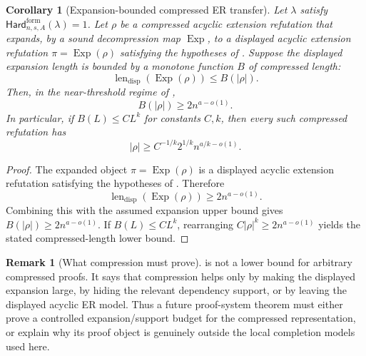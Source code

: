 \documentclass[11pt]{article}
\newtheorem{corollary}[theorem]{Corollary}
\theoremstyle{definition}
\newtheorem{remark}[theorem]{Remark}
\newcommand{\HardF}{\mathsf{Hard}^{\mathrm{form}}}
\begin{document}
\begin{corollary}[Expansion-bounded compressed ER transfer]\label{cor:compressed-er-expansion}
Let \(\lambda\) satisfy \(\HardF_{n,s,A}(\lambda)=1\).  Let \(\rho\) be a compressed acyclic extension refutation that expands, by a sound decompression map \(\operatorname{Exp}\), to a displayed acyclic extension refutation \(\pi=\operatorname{Exp}(\rho)\) satisfying the hypotheses of .  Suppose the displayed expansion length is bounded by a monotone function \(B\) of compressed length:
\[
  \operatorname{len}_{\mathrm{disp}}(\operatorname{Exp}(\rho))
  \le B(|\rho|).
\]
Then, in the near-threshold regime of ,
\[
  B(|\rho|)\ge 2n^{a-o(1)}.
\]
In particular, if \(B(L)\le C L^k\) for constants \(C,k\), then every such compressed refutation has
\[
  |\rho|\ge C^{-1/k}2^{1/k}n^{a/k-o(1)}.
\]
\end{corollary}

\begin{proof}
The expanded object \(\pi=\operatorname{Exp}(\rho)\) is a displayed acyclic extension refutation satisfying the hypotheses of .  Therefore
\[
  \operatorname{len}_{\mathrm{disp}}(\operatorname{Exp}(\rho))
  \ge 2n^{a-o(1)}.
\]
Combining this with the assumed expansion upper bound gives \(B(|\rho|)\ge 2n^{a-o(1)}\).  If \(B(L)\le C L^k\), rearranging \(C|\rho|^k\ge 2n^{a-o(1)}\) yields the stated compressed-length lower bound.
\end{proof}

\begin{remark}[What compression must prove]\label{rem:compressed-er-expansion-scope}
 is not a lower bound for arbitrary compressed proofs.  It says that compression helps only by making the displayed expansion large, by hiding the relevant dependency support, or by leaving the displayed acyclic ER model.  Thus a future proof-system theorem must either prove a controlled expansion/support budget for the compressed representation, or explain why its proof object is genuinely outside the local completion models used here.
\end{remark}
\end{document}
